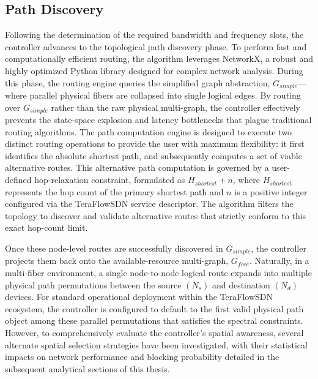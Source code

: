 \subsection{Path Discovery}
Following the determination of the required bandwidth and frequency slots, the controller advances to the topological path discovery phase. To perform fast and computationally efficient routing, the algorithm leverages NetworkX\cite{networkX}, a robust and highly optimized Python library designed for complex network analysis. During this phase, the routing engine queries the simplified graph abstraction, $G_{simple}$—where parallel physical fibers are collapsed into single logical edges. By routing over $G_{simple}$ rather than the raw physical multi-graph, the controller effectively prevents the state-space explosion and latency bottlenecks that plague traditional routing algorithms. The path computation engine is designed to execute two distinct routing operations to provide the user with maximum flexibility: it first identifies the absolute shortest path, and subsequently computes a set of viable alternative routes. This alternative path computation is governed by a user-defined hop-relaxation constraint, formulated as $H_{shortest}+n$, where $H_{shortest}$ represents the hop count of the primary shortest path and $n$ is a positive integer configured via the TeraFlowSDN service descriptor. The algorithm filters the topology to discover and validate alternative routes that strictly conform to this exact hop-count limit.

Once these node-level routes are successfully discovered in $G_{simple}$, the controller projects them back onto the available-resource multi-graph, $G_{free}$. Naturally, in a multi-fiber environment, a single node-to-node logical route expands into multiple physical path permutations between the source $(N_s)$ and destination $(N_d)$ devices. For standard operational deployment within the TeraFlowSDN ecosystem, the controller is configured to default to the first valid physical path object among these parallel permutations that satisfies the spectral constraints. However, to comprehensively evaluate the controller's spatial awareness, several alternate spatial selection strategies have been investigated, with their statistical impacts on network performance and blocking probability detailed in the subsequent analytical sections of this thesis.
